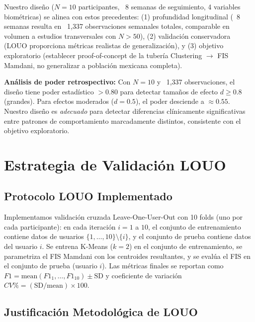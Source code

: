 Nuestro diseño ($N=10$ participantes, ~8 semanas de seguimiento, 4 variables biométricas) se alinea con estos precedentes: (1) profundidad longitudinal (~8 semanas resulta en ~1,337 observaciones semanales totales, comparable en volumen a estudios transversales con $N > 50$), (2) validación conservadora (LOUO proporciona métricas realistas de generalización), y (3) objetivo exploratorio (establecer proof-of-concept de la tubería Clustering $\rightarrow$ FIS Mamdani, no generalizar a población mexicana completa).

\textbf{Análisis de poder retrospectivo:} Con $N=10$ y ~1,337 observaciones, el diseño tiene poder estadístico $> 0.80$ para detectar tamaños de efecto $d \geq 0.8$ (grandes). Para efectos moderados ($d=0.5$), el poder desciende a $\approx 0.55$. Nuestro diseño es \textit{adecuado} para detectar diferencias clínicamente significativas entre patrones de comportamiento marcadamente distintos, consistente con el objetivo exploratorio.

\section{Estrategia de Validación LOUO}
\label{sec:estrategia_louo}

\subsection{Protocolo LOUO Implementado}
\label{subsec:protocolo_louo}

Implementamos validación cruzada Leave-One-User-Out con 10 folds (uno por cada participante): en cada iteración $i=1$ a $10$, el conjunto de entrenamiento contiene datos de usuarios $\{1,\ldots,10\} \setminus \{i\}$, y el conjunto de prueba contiene datos del usuario $i$. Se entrena K-Means ($k=2$) en el conjunto de entrenamiento, se parametriza el FIS Mamdani con los centroides resultantes, y se evalúa el FIS en el conjunto de prueba (usuario $i$). Las métricas finales se reportan como $F1 = \text{mean}(F1_1, \ldots, F1_{10}) \pm \text{SD}$ y coeficiente de variación $CV\% = (\text{SD}/\text{mean}) \times 100$.

\subsection{Justificación Metodológica de LOUO}
\label{subsec:justificacion_louo}

